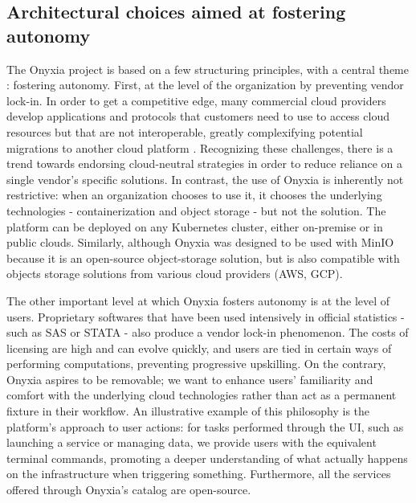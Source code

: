 
\subsection{Architectural choices aimed at fostering autonomy}

The Onyxia project is based on a few structuring principles, with a central theme : fostering autonomy. First, at the level of the organization by preventing vendor lock-in. In order to get a competitive edge, many commercial cloud providers develop applications and protocols that customers need to use to access cloud resources but that are not interoperable, greatly complexifying potential migrations to another cloud platform \cite{opara2016critical}. Recognizing these challenges, there is a trend towards endorsing cloud-neutral strategies \cite{opara2017holistic} in order to reduce reliance on a single vendor’s specific solutions. In contrast, the use of Onyxia is inherently not restrictive: when an organization chooses to use it, it chooses the underlying technologies - containerization and object storage - but not the solution. The platform can be deployed on any Kubernetes cluster, either on-premise or in public clouds. Similarly, although Onyxia was designed to be used with MinIO because it is an open-source object-storage solution, but is also compatible with objects storage solutions from various cloud providers (AWS, GCP).

The other important level at which Onyxia fosters autonomy is at the level of users. Proprietary softwares that have been used intensively in official statistics - such as SAS or STATA - also produce a vendor lock-in phenomenon. The costs of licensing are high and can evolve quickly, and users are tied in certain ways of performing computations, preventing progressive upskilling. On the contrary, Onyxia aspires to be removable; we want to enhance users' familiarity and comfort with the underlying cloud technologies rather than act as a permanent fixture in their workflow. An illustrative example of this philosophy is the platform's approach to user actions: for tasks performed through the UI, such as launching a service or managing data, we provide users with the equivalent terminal commands, promoting a deeper understanding of what actually happens on the infrastructure when triggering something. Furthermore, all the services offered through Onyxia's catalog are open-source.

